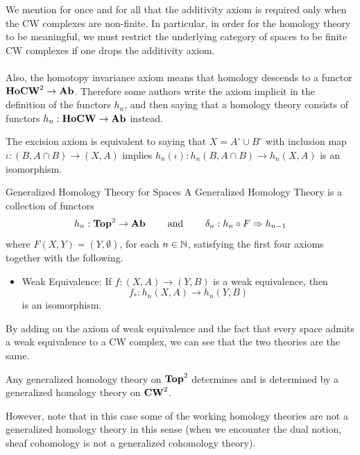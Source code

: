 \documentclass[a4paper]{article}
\begin{document}
We mention for once and for all that the additivity axiom is required only when the CW complexes are non-finite. In particular, in order for the homology theory to be meaningful, we must restrict the underlying category of spaces to be finite CW complexes if one drops the additivity axiom. \\~\\

Also, the homotopy invariance axiom means that homology descends to a functor $\bold{HoCW}^2\to\bold{Ab}$. Therefore some authors write the axiom implicit in the definition of the functors $h_n$, and then saying that a homology theory consists of functors $h_n:\bold{HoCW}\to\bold{Ab}$ instead. 

\begin{lmm}{}{} The excision axiom is equivalent to saying that $X=A^\circ\cup B^\circ$ with inclusion map $\iota:(B,A\cap B)\to (X,A)$ implies $h_n(\iota):h_n(B,A\cap B)\to h_n(X,A)$ is an isomorphism. 
\end{lmm}

\begin{defn}{Generalized Homology Theory for Spaces}{} A Generalized Homology Theory is a collection of functors $$h_n:\bold{Top}^2\to\bold{Ab}\;\;\;\;\;\;\;\text{ and }\;\;\;\;\;\;\;\delta_n:h_n\circ F\Rightarrow h_{n-1}$$ where $F(X,Y)=(Y,\emptyset)$, for each $n\in\mathbb{N}$, satisfying the first four axioms together with the following. 
\begin{itemize}
\item Weak Equivalence: If $f:(X,A)\to(Y,B)$ is a weak equivalence, then $$f_\ast:h_n(X,A)\to h_n(Y,B)$$ is an isomorphism. 
\end{itemize}
\end{defn}

By adding on the axiom of weak equivalence and the fact that every space admits a weak equivalence to a CW complex, we can see that the two theories are the same. 

\begin{thm}{}{} Any generalized homology theory on $\bold{Top}^2$ determines and is determined by a generalized homology theory on $\bold{CW}^2$.
\end{thm}

However, note that in this case some of the working homology theories are not a generalized homology theory in this sense (when we encounter the dual notion, sheaf cohomology is not a generalized cohomology theory). 
\end{document}
